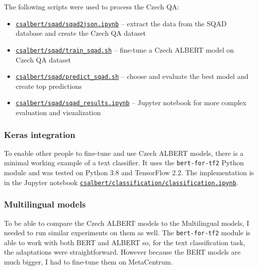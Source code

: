 \documentclass[
  printed, %
  color,   %
  table,   %
  oneside, %
  lof,     %
  lot,     %
]{fithesis3}
\begin{document}
\vspace{1em}
{\parindent=0pt
The following scripts were used to process the Czech QA: 
\begin{itemize}
    \setlength{\itemsep}{0.1em}
    
\item \href{https://github.com/ZepZep/csalbert/blob/master/sqad/sqad2json.ipynb}
    {\texttt{csalbert/sqad/sqad2json.ipynb}} 
    -- extract the data from the SQAD database and create the Czech QA dataset

\item \href{https://github.com/ZepZep/csalbert/blob/master/sqad/train_sqad.sh}
    {\texttt{csalbert/sqad/train\_sqad.sh}}
    -- fine-tune a Czech ALBERT model on Czech QA dataset

\item \href{https://github.com/ZepZep/csalbert/blob/master/sqad/train_sqad.sh}
    {\texttt{csalbert/sqad/predict\_sqad.sh}}
    -- choose and evaluate the best model and create top predictions
    
\item \href{https://github.com/ZepZep/csalbert/blob/master/sqad/sqad_results.ipynb}
    {\texttt{csalbert/sqad/sqad\_results.ipynb}}
    -- Jupyter notebook for more complex evaluation and visualization

\end{itemize}
}

\subsubsection{Keras integration}
To enable other people to fine-tune and use Czech ALBERT models, there is a minimal working example of a text classifier. It uses the \texttt{bert-for-tf2} Python module and was tested on Python 3.8 and TensorFlow 2.2. The implementation is in the Jupyter notebook \newline
\href{https://github.com/ZepZep/csalbert/blob/master/classification/classification.ipynb}{\texttt{csalbert/classification/classification.ipynb}}.

\subsubsection{Multilingual models}
To be able to compare the Czech ALBERT models to the Multilingual models, I needed to run similar experiments on them as well. The \texttt{bert-for-tf2} module is able to work with both BERT and ALBERT so, for the text classification task, the adaptations were straightforward. However because the BERT models are much bigger, I had to fine-tune them on MetaCentrum.
\end{document}

